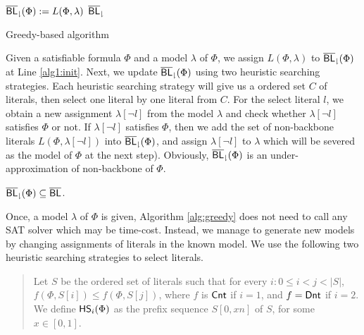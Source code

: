 \begin{algorithm}
\SetAlgoShortEnd
\SetFillComment
{}
${\sf \overline{BL}_\downharpoonright}(\Phi):=L(\Phi,\lambda)$\; \label{alg1:init}
\For{${\sf HS}$ from ${\sf HS}_1$ to ${\sf HS}_2$}{
    $C:={\sf HS}(\Phi)$\;
    $i:=0$\;
    \While{$i<|C|$}{
        $i:=i+1$,  $l:=C[i]$\;
        \If{$\lambda[\neg l]\models \Phi$}
        {
           $\NBLap(\Phi):=\NBLap(\Phi)\cup L(\Phi,\lambda[\neg l])$\;
           $\lambda:=\lambda[\neg l]$\;
        }
}

}\label{alg1:loopend}
\Return ${\sf \overline{BL}_\downharpoonright}$\;
\caption{Greedy-based algorithm}
\label{alg:greedy}
\end{algorithm}
Given a satisfiable formula $\Phi$ and a model $\lambda$ of $\Phi$,
we assign $L(\Phi,\lambda)$ to ${\sf \overline{BL}_\downharpoonright}(\Phi)$ at Line \ref{alg1:init}. Next, we update
${\sf \overline{BL}_\downharpoonright}(\Phi)$ using two heuristic searching strategies. %
Each heuristic searching strategy will give us a ordered set $C$ of literals, then select one literal by one literal from
$C$. For the select literal $l$, we obtain a new assignment $\lambda[\neg l]$ from the model
$\lambda$ and check whether  $\lambda[\neg l]$ satisfies $\Phi$ or not.
If $\lambda[\neg l]$ satisfies $\Phi$, then we add the set of non-backbone literals $L(\Phi,\lambda[\neg l])$ into ${\sf \overline{BL}_\downharpoonright}(\Phi)$, and
assign $\lambda[\neg l]$ to $\lambda$ which will be severed as the model of $\Phi$ at the next step).
Obviously,  ${\sf \overline{BL}_\downharpoonright}(\Phi)$ is an under-approximation of non-backbone of $\Phi$.

\begin{theorem}
${\sf \overline{BL}_\downharpoonright}(\Phi)\subseteq\overline{\textsf{BL}}$.
\end{theorem}

Once, a model $\lambda$ of $\Phi$ is given, Algorithm \ref{alg:greedy} does not need to call any SAT solver which may be time-cost.
Instead, we manage to generate new models by changing assignments of literals in the known model.
We use the following two heuristic searching strategies to select literals. %
\begin{quote}
Let $S$ be the ordered set of literals such that for every $i: 0\leq i<j<|S|$,
$f(\Phi,S[i])\leq f(\Phi,S[j])$, where $f$ is $\textsf{Cnt}$ if $i=1$, and $f=\textsf{Dnt}$ if $i=2$.
We define ${\sf HS}_i(\Phi)$ as the prefix sequence $S[0,xn]$ of $S$, for some $x\in[0,1]$.
\end{quote}

